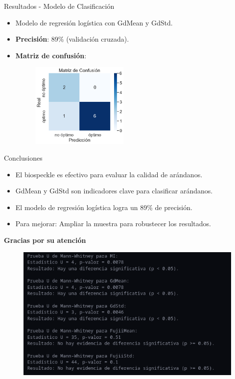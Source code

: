 \documentclass{beamer}
\begin{document}
\begin{frame}{Resultados - Modelo de Clasificación}
    \begin{itemize}
        \item Modelo de regresión logística con GdMean y GdStd.
        \item \textbf{Precisión}: 89\% (validación cruzada).
        \item \textbf{Matriz de confusión}:
        \begin{figure}
            \includegraphics[width=0.45\textwidth]{MConfusion.png}
        \end{figure}
    \end{itemize}
\end{frame}

\begin{frame}{Conclusiones}
    \begin{itemize}
        \item El biospeckle es efectivo para evaluar la calidad de arándanos.
        \item GdMean y GdStd son indicadores clave para clasificar arándanos.
        \item El modelo de regresión logística logra un 89\% de precisión.
        \item Para mejorar: Ampliar la muestra para robustecer los resultados.
    \end{itemize}
\end{frame}

\begin{frame}
    \centering
    \Huge{\textbf{Gracias por su atención}}
\end{frame}

\begin{frame}
    \begin{figure}
        \includegraphics[width =1\textwidth]{whitney.png}
    \end{figure}
\end{frame}
\end{document}
